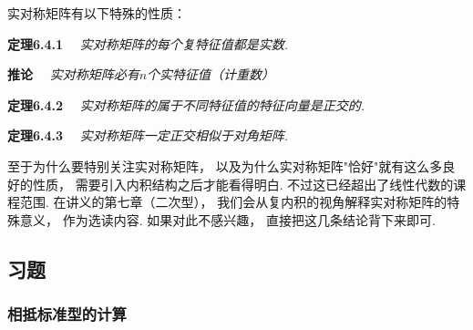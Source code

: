 实对称矩阵有以下特殊的性质：

\medskip

\textbf{定理6.4.1}~~
\textit{实对称矩阵的每个复特征值都是实数.}

\textbf{推论}~~
\textit{实对称矩阵必有$n$个实特征值（计重数）}

\medskip

\textbf{定理6.4.2}~~
\textit{实对称矩阵的属于不同特征值的特征向量是正交的.}

\textbf{定理6.4.3}~~
\textit{实对称矩阵一定正交相似于对角矩阵.}

\medskip

至于为什么要特别关注实对称矩阵，
以及为什么实对称矩阵"恰好"就有这么多良好的性质，
需要引入内积结构之后才能看得明白.
不过这已经超出了线性代数的课程范围.
在讲义的第七章（二次型），
我们会从复内积的视角解释实对称矩阵的特殊意义，
作为选读内容.
如果对此不感兴趣，
直接把这几条结论背下来即可.
\subsection{习题}


\subsubsection{相抵标准型的计算}


